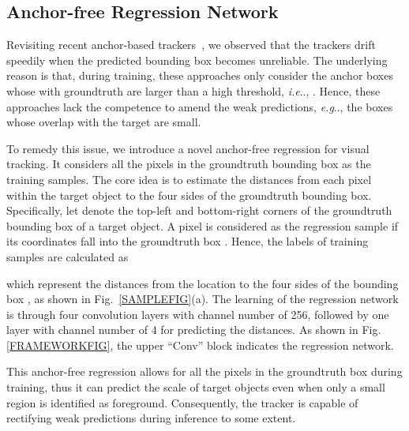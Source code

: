 \documentclass[runningheads]{llncs}
\makeatletter
\DeclareRobustCommand\onedot{\futurelet\@let@token\@onedot}
\def\@onedot{\ifx\@let@token.\else.\null\fi\xspace}
\def\eg{\emph{e.g}\onedot} \def\Eg{\emph{E.g}\onedot}
\def\ie{\emph{i.e}\onedot} \def\Ie{\emph{I.e}\onedot}
\makeatother
\begin{document}
\vspace{-1em}
\subsection{Anchor-free Regression Network}  \label{Sec3.1}



Revisiting recent anchor-based trackers~\cite{SiamRPN++,siamRPN}, we observed that the trackers drift speedily when the predicted bounding box becomes unreliable. The underlying reason is that, during training, these approaches only consider the anchor boxes whose  with groundtruth are larger than a high threshold, \ie, . Hence, these approaches lack the competence to amend the weak predictions, \eg, the boxes whose overlap with the target are small. 



To remedy this issue, we introduce a novel anchor-free regression for visual tracking. It considers all the pixels in the groundtruth bounding box as the training samples. The core idea is to  estimate the distances from each pixel within the target object to the four sides of the groundtruth bounding box. Specifically, let  denote the top-left and bottom-right corners of the groundtruth bounding box of a target object. A pixel is considered as the regression sample if its coordinates  fall into the groundtruth box . Hence, the labels  of training samples are calculated as

\vspace{-0.8em}


which represent the distances from the location  to the four sides of the bounding box , as shown in Fig.~\ref{SAMPLEFIG}(a). The learning of the regression network is through four  convolution layers with channel number of 256, followed by one  layer with channel number of 4 for predicting the distances. As shown in Fig. \ref{FRAMEWORKFIG}, the upper ``Conv'' block indicates the regression network.


This anchor-free regression allows for all the pixels in the groundtruth box during training, thus it can predict the scale of target objects even when only a small region is identified as foreground. Consequently, the tracker is capable of rectifying weak predictions during inference to some extent. 
\end{document}
